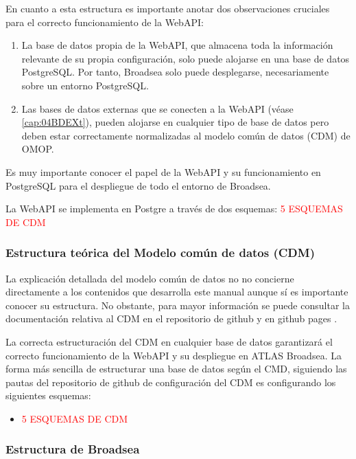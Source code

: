 En cuanto a esta estructura es importante anotar dos observaciones cruciales para el correcto funcionamiento de la WebAPI:

\begin{enumerate}
     \item La base de datos propia de la WebAPI, que almacena toda la información relevante de su propia configuración, solo puede alojarse en una base de datos PostgreSQL. Por tanto, Broadsea solo puede desplegarse, necesariamente sobre un entorno PostgreSQL.
    \item Las bases de datos externas que se conecten a la WebAPI (véase \ref{cap:04BDEXt}), pueden alojarse en cualquier tipo de base de datos pero deben estar correctamente normalizadas al modelo común de datos (CDM) de OMOP. 

\end{enumerate}

Es muy importante conocer el papel de la WebAPI y su funcionamiento en PostgreSQL para el despliegue de todo el entorno de Broadsea. 

La WebAPI se implementa en Postgre a través de dos esquemas: \textcolor{red}{5 ESQUEMAS DE CDM}

\subsubsection{Estructura teórica del Modelo común de datos (CDM)}

La explicación detallada del modelo común de datos no no concierne directamente a los contenidos que desarrolla este manual aunque sí es importante conocer su estructura. No obstante, para mayor información se puede consultar la documentación relativa al CDM en el repositorio de github \cite{githubCDM} y en github pages \cite{githubPagesCDM}.

La correcta estructuración del CDM en cualquier base de datos garantizará el correcto funcionamiento de la WebAPI y su despliegue en ATLAS Broadsea. La forma más sencilla de estructurar una base de datos según el CMD, siguiendo las pautas del repositorio de github de configuración del CDM \cite{githubCDMConfig} es configurando los siguientes esquemas:  

\begin{itemize}
    \item \textcolor{red}{5 ESQUEMAS DE CDM}
\end{itemize}



\subsubsection{Estructura de Broadsea}

